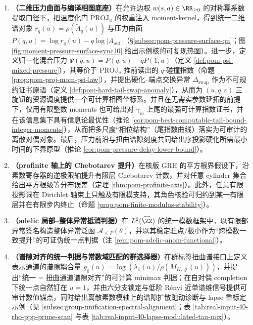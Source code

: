 \begin{enumerate}
  进一步地，共振缺口 \(\Delta(q)\) 不仅是约束维数的整数指纹（命题 \ref{prop:pom-delta-counts-constraints}），也可被解释为“使模态坐标恢复可见闭合”所需的最小新增读出轴/纤维数下界（推论 \ref{cor:pom-delta-min-extra-readouts}）。
  此外，在二阶碰撞核 \(A_2\) 上进一步给出一个秩分解驱动的“最小 5 态大统一完备化”：\(A_2\) 可写为秩一统一直达项加上秩二重态交换项 \(A_2=U+BC\)，从而只需两枚辅助重态即可生成三态低能有效核；相应的一参数插值 \(A_{\mathrm{eff}}(\alpha)=U+\alpha BC\) 的谱分裂由显式三次方程族控制，并可由主根反解 \(\alpha\)（命题 \ref{prop:pom-a2-gut-completion}、\ref{prop:pom-a2-gut-spectral-splitting}；推论 \ref{cor:pom-a2-gut-invert-alpha}）。
  \item \textbf{（二维压力曲面与编译相图底座）}在允许边权 \(w(s,a)\in\RR_{\ge 0}\) 的对称幂系数提取口径下，把温度化门 \(\mathrm{PROJ}_u\) 的权重注入 moment-kernel，得到统一二维谱对象 \(r_q(u)=\rho(\widetilde A_q(u))\) 与压力曲面 \(P(q,u)=\log r_q(u)-q\log|A_{\mathrm{out}}|\)（\S\ref{subsec:pom-pressure-surface-qu}；图 \ref{fig:moment-pressure-surface-sync10} 给出示例核的可复现热图）。进一步，定义归一化混合压力 \(\Psi(q,u)=P(q,u)-qP(1,u)\)（定义 \ref{def:pom-psi-mixed-pressure}），其等价于 \(\mathrm{PROJ}_u\) 推前读出的 \(q\)-碰撞指数（命题 \ref{prop:pom-proj-mom-psi-law}），并提出硬化--端点交换异常 \(\Delta_{\mathrm{swap}}\) 作为不可规约证书原语（定义 \ref{def:pom-hard-tail-swap-anomaly}），从而为 \((u,q,\varepsilon)\) 三旋钮的资源调度提供一个可计算相图坐标系。并且在无需实参数延拓的前提下，仅用有限整数 moments 也可给出对 \(\gamma_m\) 上尾的最强可计算指数证书，并在该信息集下具有信息论最优性（推论 \ref{cor:pom-best-computable-tail-bound-integer-moments}），从而把多尺度“相位结构”（尾指数曲线）落实为可审计的离散对偶对象。最后，压力前沿与扭曲谱隙刻度共同给出序投影硬化所需最小时间的下界原型（推论 \ref{cor:pom-pressure-delay-lower-bound}）。
  \item \textbf{（profinite 轴上的 Chebotarev 提升）}在核版 GRH 的平方根界假设下，沿素数寄存器的逆极限轴提升有限层 Chebotarev 计数，并对任意 cylinder 集合给出平方根级等分布误差（定理 \ref{thm:pom-profinite-axis}）。此外，任意有限投影词在 Dirichlet 轴束上只触及有限模支持，其角色核验可归约到某一有限层并在有限步内终止（命题 \ref{prop:pom-finite-modulus-stability}）。
  \item \textbf{（adelic 局部--整体异常抵消判据）}在 \(L^2(\widehat{\ZZ})\) 的统一模数框架中，以有限部异常签名构造整体异常泛函 \(\mathcal{A}_{\le P}(\theta)\)，并以其稳定驻点/极小作为“跨模数一致提升”的可证伪统一点判据（注 \ref{rem:pom-adelic-anom-functional}）。
  \item \textbf{（谱隙对齐的统一判据与常数域匹配的群选择器）}在群标签扭曲谱接口上定义表示通道的谱隙耦合量 \(g_{\varrho}(u)=\log(\lambda_1(u)/\rho(M_{K,\varrho}(u)))\)，并提出“统一 = 扭曲通道谱隙对齐”的可计算 minimax 判据；在自对偶 completion 下统一点自然钉在 \(u=1\)，并由六分支锁定与低阶 Rényi 近单谱维信号提供可审计数值锚点，同时给出离散素数模轴上的谱隙扩散跑动诊断与 lapse 重标定示例（见 \ref{subsec:group-unification-spectral-alignment}；表 \ref{tab:real-input-40-rho-ppp-prime-scan} 与表 \ref{tab:real-input-40-lapse-modulated-tau-mix}）。

\end{enumerate}
